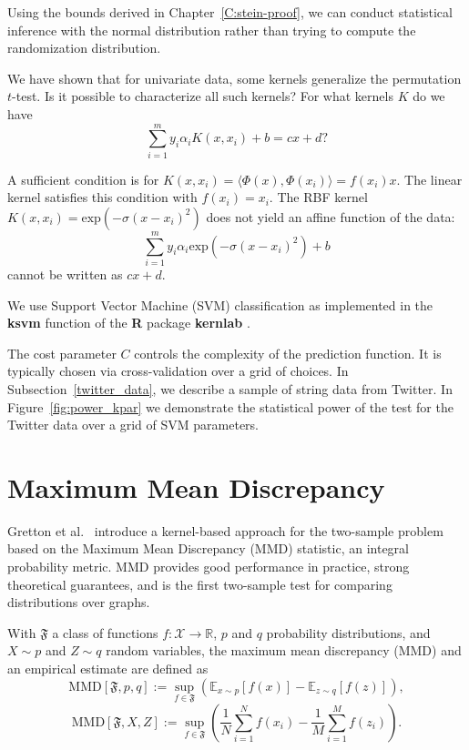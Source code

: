 Using the bounds derived in Chapter~\ref{C:stein-proof}, we can
conduct statistical inference with the normal distribution rather than
trying to compute the randomization distribution.

We have shown that for univariate data, some kernels generalize the
permutation $t$-test.  Is it possible to characterize all such kernels?
For what kernels $K$ do we have
\begin{equation}
\sum_{i=1}^m y_i \alpha_i K(x, x_i) + b = cx + d?
\end{equation}

A sufficient condition is for $K(x, x_i) = \langle \Phi(x), \Phi(x_i) \rangle =
f(x_i) x$.  The linear kernel satisfies this condition with $f(x_i) =
x_i$.  The RBF kernel $K(x, x_i) = \text{exp}(-\sigma (x-x_i)^2)$ does
not yield an affine function of the data:
\begin{equation}
\sum_{i=1}^m y_i \alpha_i \text{exp}(-\sigma (x-x_i)^2) + b
\end{equation}
cannot be written as $cx + d$.

We use Support Vector Machine (SVM) classification
as implemented in the {\bf ksvm} function of the {\bf R}
\cite{cran} package {\bf kernlab} \cite{kernlab}.

The cost parameter $C$ controls the complexity of the prediction
function. It is typically chosen via cross-validation over a grid
of choices.  In Subsection~\ref{twitter_data}, we describe a sample of
string data from Twitter.  In Figure~\ref{fig:power_kpar} we
demonstrate the statistical power of the test for the Twitter data
over a grid of SVM parameters.

\section{Maximum Mean Discrepancy}
Gretton et al.\ \cite{gretton19m, gretton2010fast, gretton2012kernel,
  borgwardt2006integrating} introduce a kernel-based approach for
the two-sample problem based on the Maximum Mean Discrepancy (MMD)
statistic, an integral probability metric.  MMD provides good
performance in practice, strong theoretical guarantees, and is the
first two-sample test for comparing distributions over graphs.

\begin{definition}
  With $\mathfrak{F}$ a class of functions $f:\mathcal{X} \to
  \mathbb{R}$, $p$ and $q$ probability distributions, and $X \sim p$
  and $Z \sim q$ random variables, the maximum mean discrepancy (MMD)
  and an empirical estimate are defined as
  \begin{equation*}
    \text{MMD}[\mathfrak{F},p,q] := \sup_{f\in
      \mathfrak{F}}(\mathbb{E}_{x\sim p}[f(x)] - \mathbb{E}_{z\sim q}[f(z)]),
  \end{equation*}
  \begin{equation*}
    \text{MMD}[\mathfrak{F},X,Z] := \sup_{f\in
      \mathfrak{F}}\left (\frac{1}{N}\sum_{i=1}^Nf(x_i) -
    \frac{1}{M}\sum_{i=1}^M f(z_i) \right ).
  \end{equation*}
\end{definition}

